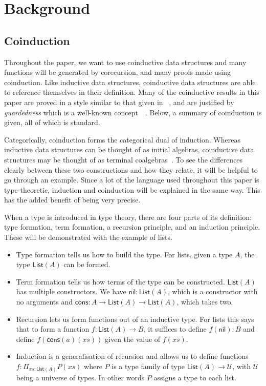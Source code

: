 \documentclass[draft]{article}
\begin{document}
\section{Background}\label{sec:background}

\subsection{Coinduction}\label{sec:coinduction}

Throughout the paper, we want to use coinductive data structures and
many functions will be generated by corecursion, and many proofs made
using coinduction. Like inductive data structures, coinductive data
structures are able to reference themselves in their definition. Many
of the coinductive results in this paper are proved in a style similar
to that given in ~\cite{kozen_silva_2017},
and are justified by \emph{guardedness} which is a well-known
concept~\cite{10.1007/3-540-58085-9_72}~\cite{gimenez1995codifying}.
Below, a summary of coinduction is given, all of which is standard.

Categorically, coinduction forms the categorical dual of induction.
Whereas inductive data structures can be thought of as initial
algebras, coinductive data structures may be thought of as terminal
coalgebras~\cite{jacobs1997tutorial}. To see the differences clearly
between these two constructions and how they relate, it will be
helpful to go through an example. Since a lot of the language used
throughout this paper is type-theoretic, induction and coinduction
will be explained in the same way. This has the added benefit of being
very precise.

When a type is introduced in type theory, there are four parts of its
definition: type formation, term formation, a recursion principle, and
an induction principle. These will be demonstrated with the example of
lists.
\begin{itemize}
\item Type formation tells us how to build the type. For lists, given
  a type \(A\), the type \(\mathsf{List}(A)\) can be formed.
\item Term formation tells us how terms of the type can be
  constructed. \(\mathsf{List}(A)\) has multiple constructors. We have
  \(\mathsf{nil} : \mathsf{List}(A)\), which is a constructor with no
  arguments and \(\mathsf{cons} : A \to \mathsf{List}(A) \to
  \mathsf{List}(A)\), which takes two.
\item Recursion lets us form functions out of an inductive type. For
  lists this says that to form a function \(f : \mathsf{List}(A) \to
  B\), it suffices to define \(f(\mathsf{nil}) : B\) and define
  \(f(\mathsf{cons}(a)(xs))\) given the value of \(f(xs)\).
\item Induction is a generalisation of recursion and allows us to
  define functions \(f : \Pi_{xs : \mathsf{List}(A)} P(xs)\) where
  \(P\) is a type family of type \(\mathsf{List}(A) \to \mathcal{U}\),
  with \(\mathcal{U}\) being a universe of types. In other words \(P\)
  assigns a type to each list.
\end{itemize}
\end{document}
